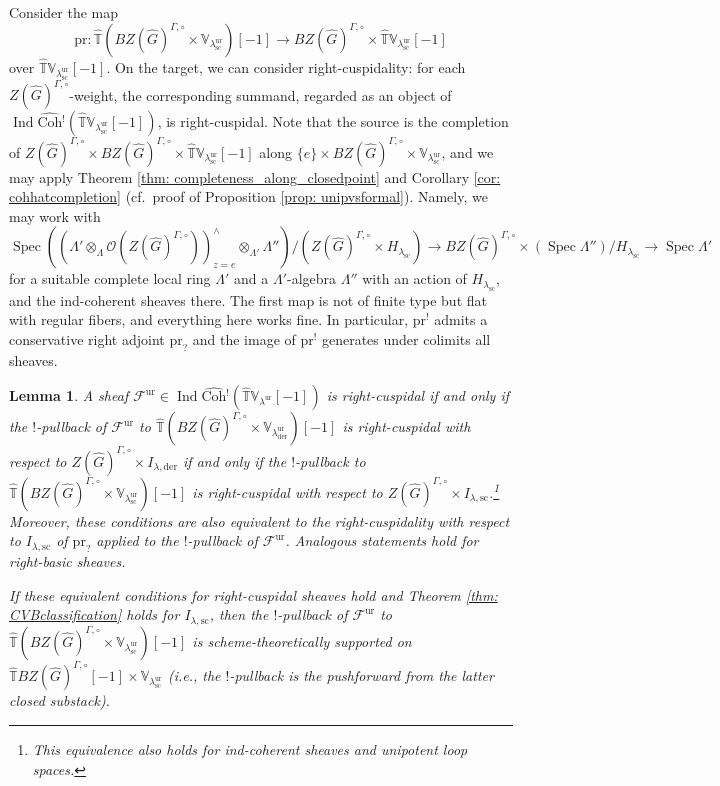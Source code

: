 \documentclass{amsart}
\newtheorem{lemma}[theorem]{Lemma}
\theoremstyle{definition}
\theoremstyle{remark}
\numberwithin{equation}{section}
\DeclareMathOperator{\Spec}{Spec}
\DeclareMathOperator{\Ind}{Ind}
\newcommand{\der}{\mathrm{der}}
\newcommand{\mc}{\mathcal}
\newcommand{\Sc}{\mathrm{sc}}
\newcommand{\wh}{\widehat}
\newcommand{\Coh}{\mathrm{Coh}}
\newcommand{\ur}{\mathrm{ur}}
\newcommand{\V}{\mathbb{V}}
\newcommand{\T}{\mathbb{T}}
\begin{document}
Consider the map
\[
\mathrm{pr}\colon
\wh{\T}(BZ(\wh G)^{\Gamma,\circ}\times \V_{\lambda_{\Sc}^\ur} )[-1] \to
BZ(\wh G)^{\Gamma,\circ}\times \wh{\T}\V_{\lambda_\Sc^\ur}[-1] 
\]
over $\wh{\T}\V_{\lambda_\Sc^\ur}[-1]$. On the target, we can consider right-cuspidality: for each $Z(\wh G)^{\Gamma,\circ}$-weight, the corresponding summand, regarded as an object of $\Ind\wh{\Coh}{}^!(\wh{\T}\V_{\lambda_\Sc^\ur}[-1])$, is right-cuspidal. Note that the source is the completion of $Z(\wh G)^{\Gamma,\circ}\times B Z(\wh G)^{\Gamma,\circ}\times \wh{\T}\V_{\lambda_\Sc^\ur}[-1]$ along $\{e\}\times BZ(\wh G)^{\Gamma,\circ}\times \V_{\lambda_\Sc^\ur}$, and we may apply Theorem \ref{thm: completeness_along_closedpoint} and Corollary \ref{cor: cohhatcompletion} (cf.~proof of Proposition \ref{prop: unipvsformal}). Namely, we may work with
\[
\Spec ((\Lambda'\otimes_\Lambda \mc{O}(Z(\wh G)^{\Gamma,\circ}))^\wedge_{z=e} \otimes_{\Lambda'} \Lambda'')/ (Z(\wh G)^{\Gamma,\circ}\times H_{\lambda_\Sc}) \to
BZ(\wh G)^{\Gamma,\circ}\times (\Spec \Lambda'')/ H_{\lambda_\Sc} \to
\Spec \Lambda'
\]
for a suitable complete local ring $\Lambda'$ and a $\Lambda'$-algebra $\Lambda''$ with an action of $H_{\lambda_\Sc}$, and the ind-coherent sheaves there. The first map is not of finite type but flat with regular fibers, and everything here works fine. In particular, $\mathrm{pr}^!$ admits a conservative right adjoint $\mathrm{pr}_?$ and the image of $\mathrm{pr}^!$ generates under colimits all sheaves. 

\begin{lemma}\label{lem: reductiontosimplyconnectedcover}
A sheaf $\mc F^\ur \in \Ind\wh{\Coh}{}^! (\wh{\T}\V_{\lambda^\ur}[-1])$ is right-cuspidal if and only if the $!$-pullback of $\mc F^\ur$ to $\wh{\T}(BZ(\wh G)^{\Gamma,\circ}\times \V_{\lambda_{\der}^\ur} )[-1]$ is right-cuspidal with respect to $Z(\wh G)^{\Gamma,\circ}\times I_{\lambda,\der}$ if and only if the $!$-pullback to  $\wh{\T}(BZ(\wh G)^{\Gamma, \circ}\times \V_{\lambda_{\Sc}^\ur})[-1]$ is right-cuspidal with respect to $Z(\wh G)^{\Gamma,\circ}\times I_{\lambda,\Sc}$.\footnote{This equivalence also holds for ind-coherent sheaves and unipotent loop spaces.} Moreover, these conditions are also equivalent to the right-cuspidality with respect to $ I_{\lambda,\Sc}$ of $\mathrm{pr}_?$ applied to the $!$-pullback of $\mc F^\ur$. Analogous statements hold for right-basic sheaves. 

If these equivalent conditions for right-cuspidal sheaves hold and Theorem \ref{thm: CVBclassification} holds for $I_{\lambda, \Sc}$, then the $!$-pullback of $\mc F^\ur$ to $\wh{\T}(BZ(\wh G)^{\Gamma,\circ}\times \V_{\lambda_\Sc^\ur})[-1]$ is scheme-theoretically supported on $\wh{\T}BZ(\wh G)^{\Gamma,\circ}[-1]\times \V_{\lambda_\Sc^\ur}$ (i.e., the $!$-pullback is the pushforward from the latter closed substack). 
\end{lemma}
\end{document}
